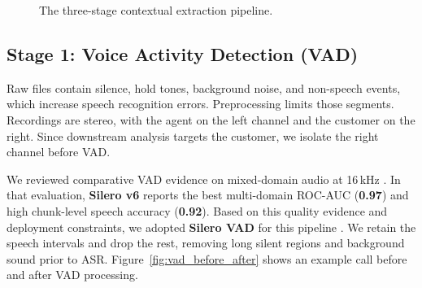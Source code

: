 \documentclass[unnumsec,webpdf,modern,large]{oup-authoring-template}%
\theoremstyle{thmstyleone}%
\theoremstyle{thmstyletwo}%
\theoremstyle{thmstylethree}%
\begin{document}
\begin{figure}[hbt!] 
  \centering
  \caption{The three-stage contextual extraction pipeline.}
  \label{fig:pipeline}
\end{figure}

\subsection{Stage 1: Voice Activity Detection (VAD)} 
Raw files contain silence, hold tones, background noise, and non-speech events, which increase speech recognition errors. Preprocessing limits those segments. Recordings are stereo, with the agent on the left channel and the customer on the right. Since downstream analysis targets the customer, we isolate the right channel before VAD. 

We reviewed comparative VAD evidence on mixed-domain audio at 16\,kHz \cite{SileroVADQualityMetrics}. In that evaluation, \textbf{Silero v6} reports the best multi-domain ROC-AUC (\textbf{0.97}) and high chunk-level speech accuracy (\textbf{0.92}). Based on this quality evidence and deployment constraints, we adopted \textbf{Silero VAD} for this pipeline \cite{SileroVAD,SileroVADQualityMetrics}. We retain the speech intervals and drop the rest, removing long silent regions and background sound prior to ASR. Figure~\ref{fig:vad_before_after} shows an example call before and after VAD processing.
 
\end{document}
